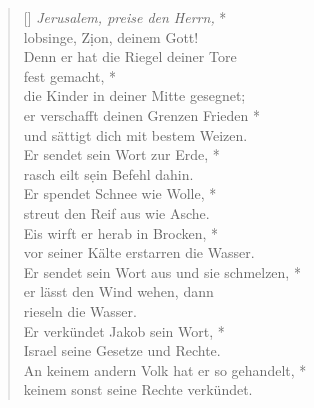 \vspace{0.6cm}

\def\greinitialformat#1{{\fontsize{40}{40}\selectfont #1}}
\gresetfirstlineaboveinitial{\small \textcolor{red}{Ps 147b}}{}
\setaboveinitialseparation{0.72mm}

\vspace{0.3cm}


\begin{verse}[\versewidth]
\textit{ Jerusalem, preise den Herrn,} *\\
lobsinge, Z\d ion, deinem Gott! \\
\vin Denn er hat die Riegel deiner Tore\\ \vin fest gemacht, *\\
\vin die Kinder in deiner Mitte gesegnet;\\
er verschafft deinen Grenzen Frieden *\\
und sättigt dich mit bestem Weizen. \\
\vin Er sendet sein Wort zur Erde, *\\
\vin rasch eilt s\d ein Befehl dahin. \\
Er spendet Schnee wie Wolle, *\\
streut den Reif aus wie Asche. \\
\vin Eis wirft er herab in Brocken, *\\
\vin vor seiner Kälte erstarren die Wasser.\\
Er sendet sein Wort aus und sie schmelzen, *\\
er lässt den Wind wehen, dann \\rieseln die Wasser.\\
\vin Er verkündet Jakob sein Wort, *\\
\vin Israel seine Gesetze und Rechte. \\
An keinem andern Volk hat er so gehandelt, *\\
keinem sonst seine Rechte verkündet. \\
\end{verse}

\vspace{0.3cm}

\def\greinitialformat#1{{\fontsize{40}{40}\selectfont #1}}
\gresetfirstlineaboveinitial{\small \textcolor{red}{Phil 2,1-6}}{}
\setaboveinitialseparation{0.72mm}

